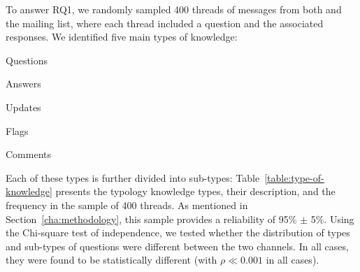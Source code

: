 To answer RQ1, we randomly sampled 400 threads of messages from both \SO and the \RH mailing list, where each thread included a question and the associated responses. We identified five main types of knowledge:
\begin{enumerate*}[label=(\arabic*)]
\item Questions
\item Answers
\item Updates
\item Flags
\item Comments
\end{enumerate*}
Each of these types is further divided into sub-types: Table~\ref{table:type-of-knowledge} presents the typology knowledge types, their description, and the frequency in the sample of 400 threads. As mentioned in Section~\ref{cha:methodology}, this sample provides a reliability of 95\% $\pm$ 5\%. Using the Chi-square test of independence, we tested whether the distribution of types and sub-types of questions were different between the two channels.  In
all cases, they were found to be statistically different (with $\rho \ll 0.001$ in all cases).
